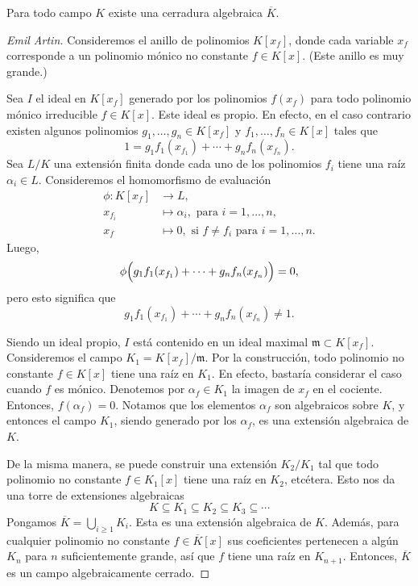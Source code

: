 \begin{teorema}
  Para todo campo $K$ existe una cerradura algebraica $\overline{K}$.

  \begin{proof}[Emil Artin]
    Consideremos el anillo de polinomios $K [x_f]$, donde cada variable $x_f$
    corresponde a un polinomio mónico no constante $f \in K [x]$.
    (Este anillo es muy grande.)

    Sea $I$ el ideal en $K [x_f]$ generado por los polinomios $f (x_f)$ para
    todo polinomio mónico irreducible $f \in K [x]$. Este ideal es propio.
    En efecto, en el caso contrario existen algunos polinomios
    $g_1, \ldots, g_n \in K [x_f]$ y $f_1,\ldots,f_n \in K [x]$ tales que
    $$1 = g_1 f_1 (x_{f_1}) + \cdots + g_n f_n (x_{f_n}).$$
    Sea $L/K$ una extensión finita donde cada uno de los polinomios $f_i$ tiene
    una raíz $\alpha_i \in L$. Consideremos el homomorfismo de evaluación
    \begin{align*}
      \phi\colon K [x_f] & \to L,\\
      x_{f_i} & \mapsto \alpha_i,\text{ para }i = 1,\ldots,n,\\
      x_f & \mapsto 0, \text{ si }f\ne f_i\text{ para }i=1,\ldots,n.
    \end{align*}
    Luego,
    $$\phi \Bigl(g_1 f_1 (x_{f_1}) + \cdots + g_n f_n (x_{f_n})\Bigr) = 0,$$
    pero esto significa que
    $$g_1 f_1 (x_{f_1}) + \cdots + g_n f_n (x_{f_n}) \ne 1.$$

    Siendo un ideal propio, $I$ está contenido en un ideal maximal
    $\mathfrak{m} \subset K [x_f]$. Consideremos el campo
    $K_1 = K [x_f]/\mathfrak{m}$. Por la construcción, todo polinomio no
    constante $f \in K [x]$ tiene una raíz en $K_1$. En efecto, bastaría
    considerar el caso cuando $f$ es mónico. Denotemos por $\alpha_f \in K_1$
    la imagen de $x_f$ en el cociente. Entonces, $f (\alpha_f) = 0$. Notamos que
    los elementos $\alpha_f$ son algebraicos sobre $K$, y entonces el campo
    $K_1$, siendo generado por los $\alpha_f$, es una extensión algebraica de
    $K$.

    De la misma manera, se puede construir una extensión $K_2 / K_1$ tal que
    todo polinomio no constante $f \in K_1 [x]$ tiene una raíz en $K_2$,
    etcétera. Esto nos da una torre de extensiones algebraicas
    $$K \subseteq K_1 \subseteq K_2 \subseteq K_3 \subseteq \cdots$$
    Pongamos $\overline{K} = \bigcup_{i\ge 1} K_i$.
    Esta es una extensión algebraica de $K$. Además, para cualquier polinomio no
    constante $f \in \overline{K} [x]$ sus coeficientes pertenecen a algún $K_n$
    para $n$ suficientemente grande, así que $f$ tiene una raíz en
    $K_{n+1}$. Entonces, $\overline{K}$ es un campo algebraicamente cerrado.
  \end{proof}
\end{teorema}

